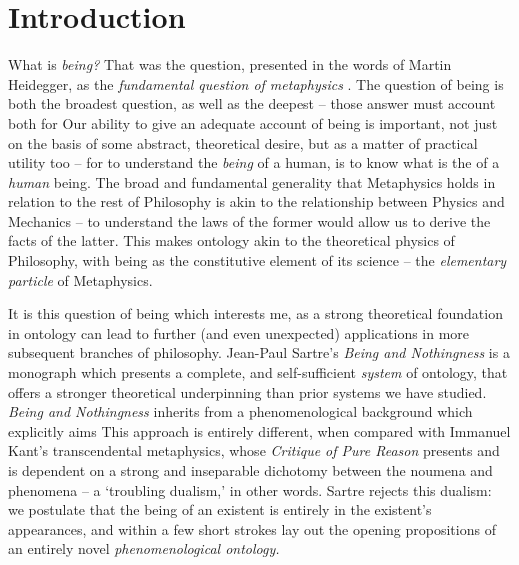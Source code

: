 \chapter{Introduction}



What is \emph{being?}  That was the question, presented in the words of Martin Heidegger, as the \emph{fundamental question of metaphysics} \autocite[1]{Heidegger}. The question of being is both the broadest question, as well as the deepest -- those answer must account both for  Our ability to give an adequate account of being is important, not just on the basis of some abstract, theoretical desire, but as a matter of practical utility too -- for to understand the \emph{being} of a human, is to know what is the  of a \emph{human} being. The broad and fundamental generality that Metaphysics holds in relation to the rest of Philosophy is akin to the relationship between Physics and Mechanics -- to understand the laws of the former would allow us to derive the facts of the latter. This makes ontology akin to the theoretical physics of Philosophy, with being as the constitutive element of its science -- the \emph{elementary particle} of Metaphysics.


It is this question of being which interests me, as a strong theoretical foundation in ontology can lead to further (and even unexpected) applications in more subsequent branches of philosophy. Jean-Paul Sartre's \emph{Being and Nothingness} is a monograph which presents a complete, and self-sufficient \emph{system} of ontology, that offers a stronger theoretical underpinning than prior systems we have studied. \emph{Being and Nothingness} inherits from a phenomenological background which explicitly aims  This approach is entirely different, when compared with Immanuel Kant's transcendental metaphysics, whose \emph{Critique of Pure Reason} presents and is dependent on a strong and inseparable dichotomy between the noumena and phenomena -- a \enquote*{troubling dualism,} in other words. Sartre rejects this dualism: we postulate that the being of an existent is entirely in the existent's appearances, and within a few short strokes lay out the opening propositions of an entirely novel \emph{phenomenological ontology.}

